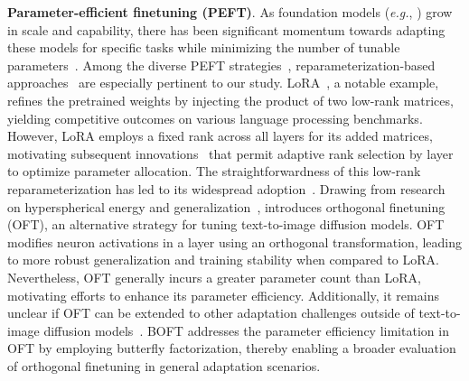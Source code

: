 \textbf{Parameter-efficient finetuning (PEFT)}. As foundation models (\emph{e.g.}, \cite{brown2020language,radford2021learning,rombach2022high,kirillov2023segment}) grow in scale and capability, there has been significant momentum towards adapting these models for specific tasks while minimizing the number of tunable parameters~\cite{treviso2023efficient,ding2023parameter,lialin2023scaling}. Among the diverse PEFT strategies~\cite{houlsby2019parameter,aghajanyan2020intrinsic,hulora2022,edalati2022krona,wang2022adamix,gheini2021cross,zaken2022bitfit,guo2020parameter,sung2021training,ansell2022composable,lester2021power,li2021prefix,vu2022spot,he2021towards,mao2021unipelt,karimi2021compacter,liu2022few,sung2022lst,chen2022parameter,jia2022visual,chen2022adaptformer,zhang2022neural,jie2023fact,lian2022scaling,luo2023towards}, reparameterization-based approaches~\cite{aghajanyan2020intrinsic,hulora2022,edalati2022krona} are especially pertinent to our study. LoRA~\cite{hulora2022}, a notable example, refines the pretrained weights by injecting the product of two low-rank matrices, yielding competitive outcomes on various language processing benchmarks. However, LoRA employs a fixed rank across all layers for its added matrices, motivating subsequent innovations~\cite{zhang2022adaptive,valipour2022dylora,zhang2023increlora} that permit adaptive rank selection by layer to optimize parameter allocation. The straightforwardness of this low-rank reparameterization has led to its widespread adoption~\cite{dettmers2023qlora,zi2023delta,chavan2023one}. Drawing from research on hyperspherical energy and generalization~\cite{liu2018learning,liu2021orthogonal}, \cite{qiu2023controlling} introduces orthogonal finetuning (OFT), an alternative strategy for tuning text-to-image diffusion models. OFT modifies neuron activations in a layer using an orthogonal transformation, leading to more robust generalization and training stability when compared to LoRA. Nevertheless, OFT generally incurs a greater parameter count than LoRA, motivating efforts to enhance its parameter efficiency. Additionally, it remains unclear if OFT can be extended to other adaptation challenges outside of text-to-image diffusion models~\cite{qiu2023controlling}. BOFT addresses the parameter efficiency limitation in OFT by employing butterfly factorization, thereby enabling a broader evaluation of orthogonal finetuning in general adaptation scenarios.

